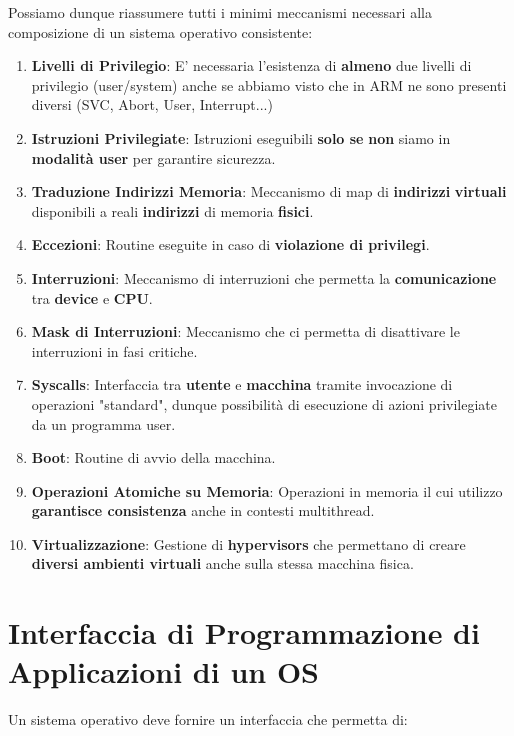 \documentclass{article}
\begin{document}
Possiamo dunque riassumere tutti i minimi meccanismi necessari alla composizione di un sistema operativo consistente:

\begin{enumerate}
    \item \textbf{Livelli di Privilegio}: E' necessaria l'esistenza di \textbf{almeno} due livelli di privilegio (user/system) anche se abbiamo visto che in ARM ne sono presenti diversi (SVC, Abort, User, Interrupt...)
    \item \textbf{Istruzioni Privilegiate}: Istruzioni eseguibili \textbf{solo se} \textbf{non} siamo in \textbf{modalità user} per garantire sicurezza.
    \item \textbf{Traduzione Indirizzi Memoria}: Meccanismo di map di \textbf{indirizzi} \textbf{virtuali} disponibili a reali \textbf{indirizzi} di memoria \textbf{fisici}.
    \item \textbf{Eccezioni}: Routine eseguite in caso di \textbf{violazione di privilegi}.
    \item \textbf{Interruzioni}: Meccanismo di interruzioni che permetta la \textbf{comunicazione} tra \textbf{device} e \textbf{CPU}.
    \item \textbf{Mask di Interruzioni}: Meccanismo che ci permetta di disattivare le interruzioni in fasi critiche.
    \item \textbf{Syscalls}: Interfaccia tra \textbf{utente} e \textbf{macchina} tramite invocazione di operazioni "standard", dunque possibilità di esecuzione di azioni privilegiate da un programma user.
    \item \textbf{Boot}: Routine di avvio della macchina.
    \item \textbf{Operazioni Atomiche su Memoria}: Operazioni in memoria il cui utilizzo \textbf{garantisce consistenza} anche in contesti multithread.
    \item \textbf{Virtualizzazione}: Gestione di \textbf{hypervisors} che permettano di creare \textbf{diversi ambienti virtuali} anche sulla stessa macchina fisica. 
\end{enumerate}

\newpage

\section{Interfaccia di Programmazione di Applicazioni di un OS}

Un sistema operativo deve fornire un interfaccia che permetta di:
\end{document}

